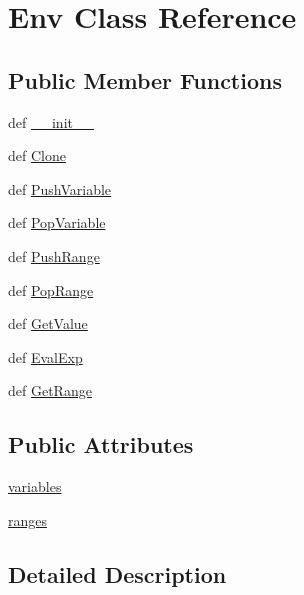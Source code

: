 \hypertarget{classpump_1_1Env}{\section{\-Env \-Class \-Reference}
\label{da/da8/classpump_1_1Env}
}
\subsection*{\-Public \-Member \-Functions}
\begin{DoxyCompactItemize}
\item 
def \hyperlink{classpump_1_1Env_ac775ee34451fdfa742b318538164070e}{\-\_\-\-\_\-init\-\_\-\-\_\-}
\item 
def \hyperlink{classpump_1_1Env_aff981755ef197de06774d0c1cf6cceb9}{\-Clone}
\item 
def \hyperlink{classpump_1_1Env_ad15bfa5e02880960d286a9e65baa9970}{\-Push\-Variable}
\item 
def \hyperlink{classpump_1_1Env_a0737f9f157a0f0be4afd96e6dc3ac593}{\-Pop\-Variable}
\item 
def \hyperlink{classpump_1_1Env_af7e99fe7b9308e38d5b9ca4a8db4d56b}{\-Push\-Range}
\item 
def \hyperlink{classpump_1_1Env_a3e7851a1a19d0482235a323e97dce8ff}{\-Pop\-Range}
\item 
def \hyperlink{classpump_1_1Env_a6ad5f2dce23561603333027d43b0cc2e}{\-Get\-Value}
\item 
def \hyperlink{classpump_1_1Env_a015f55a8b9d3a8c6694baa05d0970b33}{\-Eval\-Exp}
\item 
def \hyperlink{classpump_1_1Env_a7689fcbdac40eafa498ffca7cbe2bf7d}{\-Get\-Range}
\end{DoxyCompactItemize}
\subsection*{\-Public \-Attributes}
\begin{DoxyCompactItemize}
\item 
\hyperlink{classpump_1_1Env_a626e63c7be6e71872233832cce1dccc0}{variables}
\item 
\hyperlink{classpump_1_1Env_ad11a1805dd4f6710e9566106c6f795f2}{ranges}
\end{DoxyCompactItemize}


\subsection{\-Detailed \-Description}


